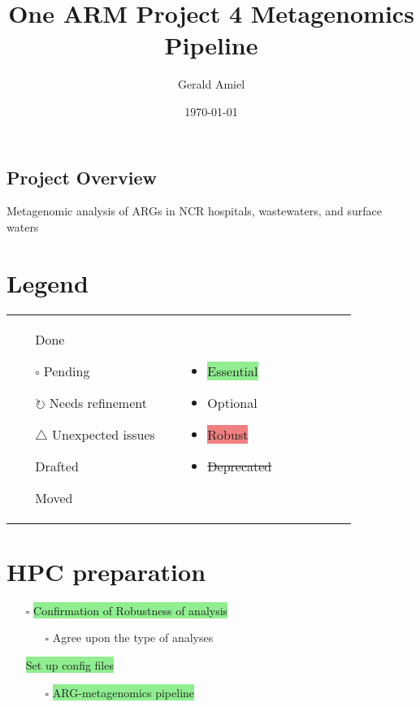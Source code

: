 \documentclass[11pt]{report}
\title{One ARM Project 4 Metagenomics Pipeline}
\author{Gerald Amiel}
\date{\today}
\newcommand{\done}{\checkmark}  %
\newcommand{\pending}{$\square$}  %
\newcommand{\refine}{$\circlearrowright$}  %
\newcommand{\issue}{$\triangle$}  %
\newcommand{\draft}{\faPencil}
\newcommand{\moved}{\faArrowCircleRight}
\newcommand{\highlightessential}[1]{\colorbox{lightgreen}{#1}}  %
\newcommand{\highlightoptional}[1]{\colorbox{lightorange}{#1}}  %
\newcommand{\highlightrobust}[1]{\colorbox{lightcoral}{#1}}  %
\newcommand{\deprecated}[1]{\sout{#1}}  %
\begin{document}
	
\begin{multicols}{1}
	\section*{Project Overview}
	Metagenomic analysis of ARGs in NCR hospitals, wastewaters, and surface waters
\end{multicols}

\begin{multicols}{2}

\section*{Legend}
\begin{tabular}{p{0.45\linewidth} p{0.45\linewidth}} %
	\begin{itemize}
		\item [\done] Done
		\item [\pending] Pending
		\item [\refine] Needs refinement
		\item [\issue] Unexpected issues
		\item [\draft] Drafted
		\item [\moved] Moved
	\end{itemize}
	&
	\begin{itemize}
		\item \highlightessential{Essential}
		\item \highlightoptional{Optional}
		\item \highlightrobust{Robust}
		\item \deprecated{Deprecated}  %
	\end{itemize}
\end{tabular}




	
	\section*{HPC preparation}
	\begin{itemize}
		\item [\pending] \highlightessential{Confirmation of Robustness of analysis}
			\begin{itemize}
				\item [\pending] Agree upon the type of analyses
			\end{itemize}
			\item [\done] \highlightessential{Set up config files}
		\begin {itemize}
		\item [\pending] \highlightessential{ARG-metagenomics pipeline}
		

\end{itemize}
\end{itemize}
\end{multicols}
\end{document}
